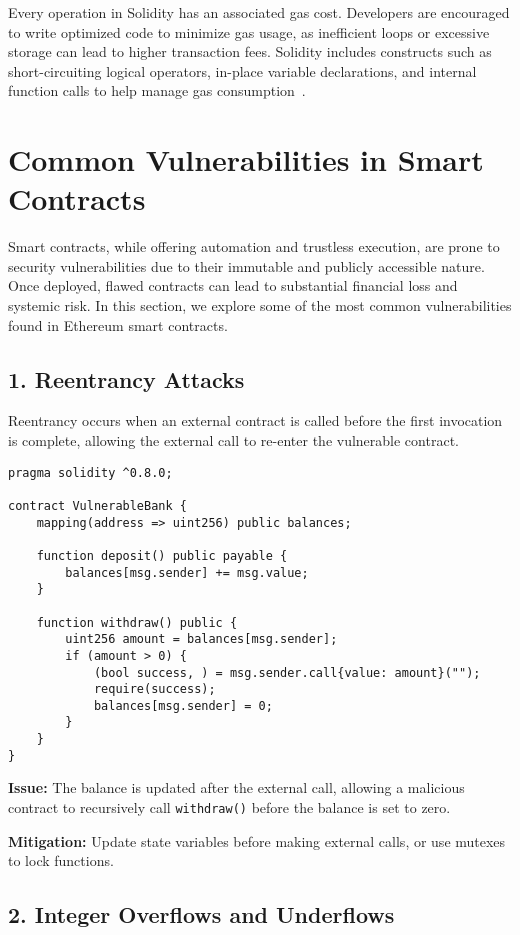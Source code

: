 Every operation in Solidity has an associated gas cost. Developers are encouraged to write optimized code to minimize gas usage, as inefficient loops or excessive storage can lead to higher transaction fees. Solidity includes constructs such as short-circuiting logical operators, in-place variable declarations, and internal function calls to help manage gas consumption~\cite{wood2014ethereum}.

\section{Common Vulnerabilities in Smart Contracts}
Smart contracts, while offering automation and trustless execution, are prone to security vulnerabilities due to their immutable and publicly accessible nature. Once deployed, flawed contracts can lead to substantial financial loss and systemic risk. In this section, we explore some of the most common vulnerabilities found in Ethereum smart contracts.
\subsection*{1. Reentrancy Attacks}
Reentrancy occurs when an external contract is called before the first invocation is complete, allowing the external call to re-enter the vulnerable contract.

\begin{lstlisting}[language=Solidity, caption=Reentrancy vulnerability example, label={lst:reentrancy_vuln}, captionpos=b]
pragma solidity ^0.8.0;

contract VulnerableBank {
    mapping(address => uint256) public balances;

    function deposit() public payable {
        balances[msg.sender] += msg.value;
    }

    function withdraw() public {
        uint256 amount = balances[msg.sender];
        if (amount > 0) {
            (bool success, ) = msg.sender.call{value: amount}("");
            require(success);
            balances[msg.sender] = 0;
        }
    }
}
\end{lstlisting}

\textbf{Issue:} The balance is updated after the external call, allowing a malicious contract to recursively call \texttt{withdraw()} before the balance is set to zero.

\textbf{Mitigation:} Update state variables before making external calls, or use mutexes to lock functions.

\subsection*{2. Integer Overflows and Underflows}


